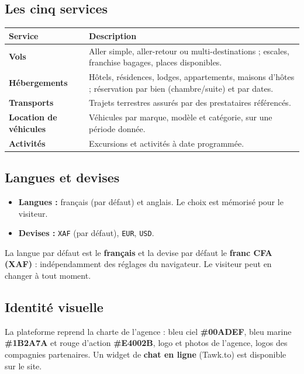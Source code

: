 \documentclass[11pt,a4paper]{article}
\newcommand{\etat}[1]{\textcolor{taNavy}{\texttt{#1}}}
\begin{document}
\subsection{Les cinq services}
\begin{center}
\begin{longtable}{>{\raggedright}p{3.4cm} p{10cm}}
\toprule
\textbf{Service} & \textbf{Description} \\
\midrule
\endhead
\textbf{Vols} & Aller simple, aller-retour ou multi-destinations ; escales, franchise bagages, places disponibles. \\
\textbf{Hébergements} & Hôtels, résidences, lodges, appartements, maisons d'hôtes ; réservation par bien (chambre/suite) et par dates. \\
\textbf{Transports} & Trajets terrestres assurés par des prestataires référencés. \\
\textbf{Location de véhicules} & Véhicules par marque, modèle et catégorie, sur une période donnée. \\
\textbf{Activités} & Excursions et activités à date programmée. \\
\bottomrule
\end{longtable}
\end{center}

\subsection{Langues et devises}
\begin{itemize}[leftmargin=1.4em]
  \item \textbf{Langues :} français (par défaut) et anglais. Le choix est mémorisé pour le visiteur.
  \item \textbf{Devises :} \etat{XAF} (par défaut), \etat{EUR}, \etat{USD}.
\end{itemize}

\begin{astuce}
La langue par défaut est le \textbf{français} et la devise par défaut le \textbf{franc CFA
(XAF)} : indépendamment des réglages du navigateur. Le visiteur peut en changer à tout moment.
\end{astuce}

\subsection{Identité visuelle}
La plateforme reprend la charte de l'agence : bleu ciel \textbf{\#00ADEF}, bleu marine
\textbf{\#1B2A7A} et rouge d'action \textbf{\#E4002B}, logo et photos de l'agence, logos des
compagnies partenaires. Un widget de \textbf{chat en ligne} (Tawk.to) est disponible sur le site.
\end{document}
